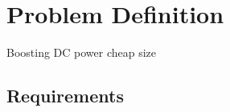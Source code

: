 \chapter{Problem Definition}\label{ch:probdesc}
Boosting DC power
cheap
size


\section{Requirements}

